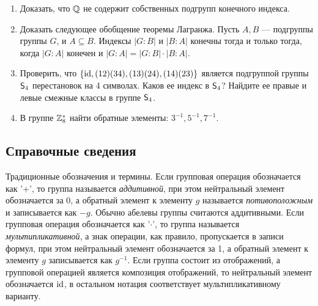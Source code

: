 \begin{enumerate}
\item Доказать, что $\mathbb Q$ не содержит собственных подгрупп конечного индекса.

\item Доказать следующее обобщение теоремы Лагранжа. Пусть $A,B$ --- подгруппы группы $G$, и $A\subseteq B$. Индексы $|G:B|$ и $|B:A|$ конечны тогда и только тогда, когда $|G:A|$ конечен и $|G:A|=|G:B|\cdot|B:A|$.

\item Проверить, что $\{\mathrm{id},(12)(34),(13)(24),(14)(23)\}$ является подгруппой группы ${\mathsf{S}}_4$ перестановок на 4 символах. Каков ее индекс в ${\mathsf{S}}_4$? Найдите ее правые и левые смежные классы в группе ${\mathsf{S}}_4$.

\item В группе $\mathbb Z_8^*$ найти обратные элементы: $3^{-1}, 5^{-1}, 7^{-1}$.

\end{enumerate}

\subsection*{Справочные сведения}

Традиционные обозначения и термины. Если групповая операция обозначается как '+', то группа называется \textit{аддитивной}, при этом нейтральный элемент обозначается за 0, а обратный элемент к элементу $g$ называется \textit{потивоположным} и записывается как $-g$. Обычно абелевы группы считаются аддитивными. Если групповая операция обозначается как '$\cdot$', то группа называется \textit{мультипликативной}, а знак операции, как правило, пропускается в записи формул, при этом нейтральный элемент обозначается за 1, а обратный элемент к элементу $g$ записывается как $g^{-1}$. Если группа состоит из отображений, а групповой операцией является композиция отображений, то нейтральный элемент обозначается $\mathrm{id}$, в остальном нотация соответствует мультипликативному варианту.


